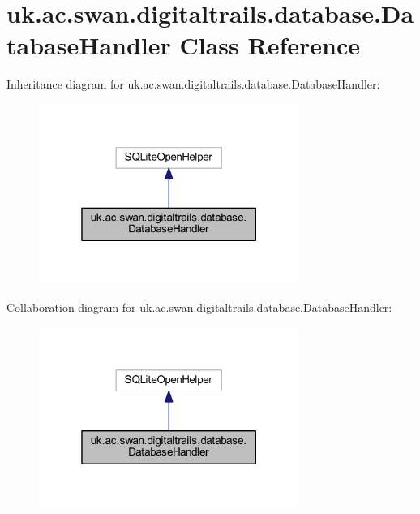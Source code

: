 \hypertarget{classuk_1_1ac_1_1swan_1_1digitaltrails_1_1database_1_1_database_handler}{\section{uk.\+ac.\+swan.\+digitaltrails.\+database.\+Database\+Handler Class Reference}
\label{classuk_1_1ac_1_1swan_1_1digitaltrails_1_1database_1_1_database_handler}
}


Inheritance diagram for uk.\+ac.\+swan.\+digitaltrails.\+database.\+Database\+Handler\+:\nopagebreak
\begin{figure}[H]
\begin{center}
\leavevmode
\includegraphics[width=241pt]{classuk_1_1ac_1_1swan_1_1digitaltrails_1_1database_1_1_database_handler__inherit__graph}
\end{center}
\end{figure}


Collaboration diagram for uk.\+ac.\+swan.\+digitaltrails.\+database.\+Database\+Handler\+:\nopagebreak
\begin{figure}[H]
\begin{center}
\leavevmode
\includegraphics[width=241pt]{classuk_1_1ac_1_1swan_1_1digitaltrails_1_1database_1_1_database_handler__coll__graph}
\end{center}
\end{figure}
